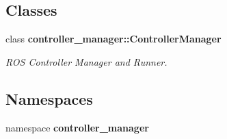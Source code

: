 \subsection*{\-Classes}
\begin{DoxyCompactItemize}
\item 
class {\bf controller\-\_\-manager\-::\-Controller\-Manager}
\begin{DoxyCompactList}\small\item\em \-R\-O\-S \-Controller \-Manager and \-Runner. \end{DoxyCompactList}\end{DoxyCompactItemize}
\subsection*{\-Namespaces}
\begin{DoxyCompactItemize}
\item 
namespace {\bf controller\-\_\-manager}
\end{DoxyCompactItemize}
